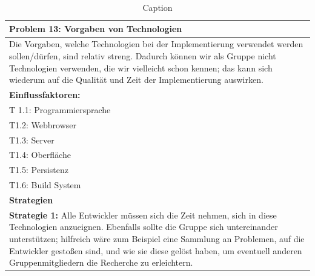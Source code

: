 \documentclass[enabledeprecatedfontcommands,fontsize=12pt,paper=a4,twoside]{scrartcl}
\begin{document}
\begin{table}[H]
    \centering
    \begin{tabular}{|p{15cm}|}
    \hline
          \textbf{Problem 13:} Vorgaben von Technologien %
          \\ \hline
          Die Vorgaben, welche Technologien bei der Implementierung verwendet werden sollen/dürfen, sind relativ streng. Dadurch können wir als Gruppe nicht Technologien verwenden, die wir vielleicht schon kennen; das kann sich wiederum auf die Qualität und Zeit der Implementierung auswirken.
          \\ \hline
          \textbf{Einflussfaktoren: } \\
          T 1.1: Programmiersprache \\
          T1.2: Webbrowser \\
          T1.3: Server \\
          T1.4: Oberfläche \\
          T1.5: Persistenz \\
          T1.6: Build System \\
          \hline
          \textbf{Strategien} \\ \hline
          \textbf{Strategie 1:} Alle Entwickler müssen sich die Zeit nehmen, sich in diese Technologien anzueignen. Ebenfalls sollte die Gruppe sich untereinander unterstützen; hilfreich wäre zum Beispiel eine Sammlung an Problemen, auf die Entwickler gestoßen sind, und wie sie diese gelöst haben, um eventuell anderen Gruppenmitgliedern die Recherche zu erleichtern.
          \\ \hline
    \end{tabular}
    \caption{Caption}
    \label{tab:my_label}
\end{table}
\end{document}
